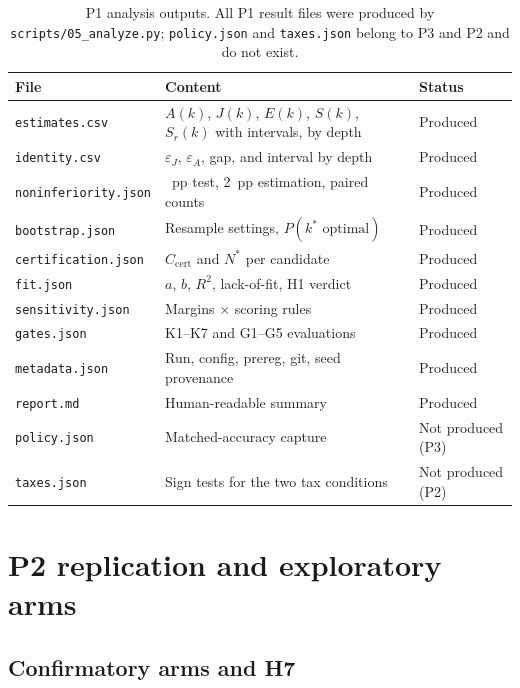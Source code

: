 \documentclass[a4paper,fleqn]{cas-sc}
\begin{document}
\begin{table}[pos=htbp]
  \centering
  \caption{P1 analysis outputs. All P1 result files were produced by
  \texttt{scripts/05\_analyze.py}; \texttt{policy.json} and \texttt{taxes.json} belong to P3 and
  P2 and do not exist.}
  \label{tab:outputs}
  \small
  \begin{tabularx}{\textwidth}{>{\raggedright\arraybackslash}p{4.0cm}>{\raggedright\arraybackslash}p{6.3cm}>{\raggedright\arraybackslash}X}
    \toprule
    \textbf{File} & \textbf{Content} & \textbf{Status} \\
    \midrule
    \texttt{estimates.csv} & $A(k)$, $J(k)$, $E(k)$, $S(k)$, $S_r(k)$ with intervals, by depth & Produced \\
    \texttt{identity.csv} & $\varepsilon_J$, $\varepsilon_A$, gap, and interval by depth & Produced \\
    \texttt{noninferiority.json} & 5~pp test, 2~pp estimation, paired counts & Produced \\
    \texttt{bootstrap.json} & Resample settings, $P(k^{*}\text{ optimal})$ & Produced \\
    \texttt{certification.json} & $C_{\mathrm{cert}}$ and $N^{*}$ per candidate & Produced \\
    \texttt{fit.json} & $a$, $b$, $R^2$, lack-of-fit, H1 verdict & Produced \\
    \texttt{sensitivity.json} & Margins $\times$ scoring rules & Produced \\
    \texttt{gates.json} & K1--K7 and G1--G5 evaluations & Produced \\
    \texttt{metadata.json} & Run, config, prereg, git, seed provenance & Produced \\
    \texttt{report.md} & Human-readable summary & Produced \\
    \texttt{policy.json} & Matched-accuracy capture & Not produced (P3) \\
    \texttt{taxes.json} & Sign tests for the two tax conditions & Not produced (P2) \\
    \bottomrule
  \end{tabularx}
\end{table}

\section{P2 replication and exploratory arms}\label{sec:s8}

\subsection{Confirmatory arms and H7}
\end{document}
